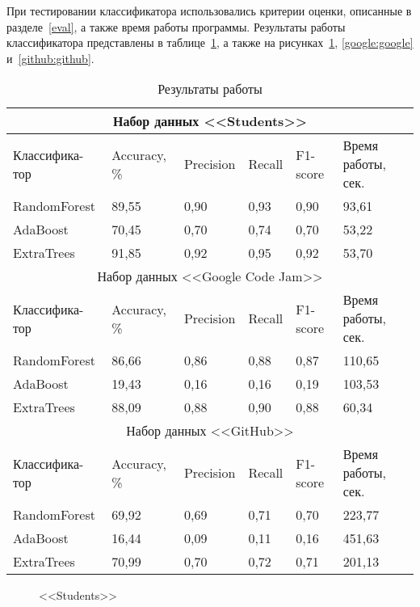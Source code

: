 При тестировании классификатора использовались критерии оценки, описанные в разделе~\ref{eval}, 
а также время работы программы. Результаты работы классификатора представлены в таблице~\ref{tab:results}, а также
на рисунках~\ref{students_res:students_res}, \ref{google:google} и~\ref{github:github}.

\begin{table}[h!]
\caption{ Результаты работы }
\label{tab:results}
\begin{center}
\begin{tabularx}{\linewidth}{|X|X|X|X|X|X|}
\hline
\multicolumn{6}{|c|}{Набор данных <<Students>>} \\
\hline
Классифика- тор & Accuracy, \% & Precision & Recall & F1-score & Время работы, сек.\\
\hline
RandomForest & 89,55 & 0,90 & 0,93 & 0,90 & 93,61\\
\hline
AdaBoost & 70,45 & 0,70 & 0,74 & 0,70 & 53,22\\
\hline
ExtraTrees & 91,85 & 0,92 & 0,95 & 0,92 & 53,70 \\
\hline
\multicolumn{6}{|c|}{Набор данных <<Google Code Jam>>} \\
\hline
Классифика- тор & Accuracy, \% & Precision & Recall & F1-score & Время работы, сек.\\
\hline
RandomForest & 86,66 & 0,86 & 0,88 & 0,87 & 110,65\\
\hline
AdaBoost & 19,43 & 0,16 & 0,16 & 0,19 & 103,53\\
\hline
ExtraTrees & 88,09 & 0,88 & 0,90 & 0,88 & 60,34 \\
\hline
\multicolumn{6}{|c|}{Набор данных <<GitHub>>} \\
\hline
Классифика- тор & Accuracy, \% & Precision & Recall & F1-score & Время работы, сек.\\
\hline
RandomForest & 69,92 & 0,69 & 0,71 & 0,70 & 223,77\\
\hline
AdaBoost & 16,44 & 0,09 & 0,11 & 0,16 & 451,63\\
\hline
ExtraTrees & 70,99 & 0,70 & 0,72 & 0,71 & 201,13 \\
\hline
\end{tabularx}
\end{center}
\end{table}

\begin{figure}[h!]
\caption{ <<Students>> }
\label{students_res:students_res}
\end{figure}

